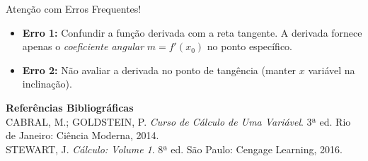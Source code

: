 \documentclass[12pt,a4paper]{article}
\begin{document}
\begin{atencao}{Atenção com Erros Frequentes!}
  \begin{itemize}
    \item \textbf{Erro 1:} Confundir a função derivada com a reta tangente. A derivada fornece apenas o \textit{coeficiente angular} $m = f'(x_0)$ no ponto específico.
    \item \textbf{Erro 2:} Não avaliar a derivada no ponto de tangência (manter $x$ variável na inclinação).
  \end{itemize}
\end{atencao}

\begin{center}
    \small \textbf{Referências Bibliográficas} \\
    CABRAL, M.; GOLDSTEIN, P. \textit{Curso de Cálculo de Uma Variável}. 3ª ed. Rio de Janeiro: Ciência Moderna, 2014. \\
    STEWART, J. \textit{Cálculo: Volume 1}. 8ª ed. São Paulo: Cengage Learning, 2016.
\end{center}
\end{document}
